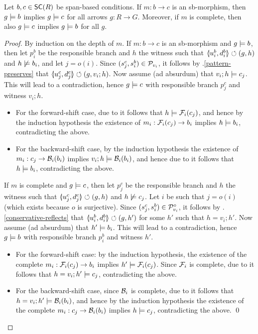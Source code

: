\begin{proposition}
Let $b,c \in \SC{R}$ be span-based conditions. If $m:b\to c$ is an sb-morphism, then $g\models b$ implies $g \models c$ for all arrows $g:R\to G$. Moreover, if $m$ is complete, then also $g\models c$ implies $g\models b$ for all $g$.
\end{proposition}
%
\begin{fullorname}
\begin{proof}
By induction on the depth of $m$. If $m:b\to c$ is an sb-morphism and $g\models b$, then let $p^b_i$ be the responsible branch and $h$ the witness such that $\spanof{u^b_i}{d^b_i}\commutes (g,h)$ and $h\not\models b_i$, and let $j=o(i)$. Since $(s^c_j,s^b_i)\in \mathcal{P}_{v_i}$, it follows by .\ref{pattern-preserves} that $\spanof{u^c_j}{d^c_j}\commutes (g,v_i;h)$. Now assume (ad absurdum) that $v_i;h\models c_j$. This will lead to a contradiction, hence $g\models c$ with responsible branch $p^c_j$ and witness $v_i;h$.
\begin{itemize}[topsep=\smallskipamount]
\item For the forward-shift case, due to  it follows that $h\models \mathcal{F}_i(c_j)$, and hence by the induction hypothesis the existence of $m_i:\mathcal{F}_i(c_j)\rightarrow b_i$ implies $h\models b_i$, contradicting the above.

\item For the backward-shift case, by the induction hypothesis the existence of $m_i:c_j\rightarrow \mathcal{B}_i(b_i)$ implies $v_i;h\models \mathcal{B}_i(b_i)$, and hence due to  it follows that $h\models b_i$, contradicting the above.
\end{itemize}
If $m$ is complete and $g\models c$, then let $p^c_j$ be the responsible branch and $h$ the witness such that $\spanof{u^c_j}{d^c_j}\commutes (g,h)$ and $h\not\models c_j$. Let $i$ be such that $j=o(i)$ (which exists because $o$ is surjective). Since $(s^c_j,s^b_i)\in \mathcal{P}^\circ_{v_i}$, it follows by .\ref{conservative-reflects} that $\spanof{u^b_i}{d^b_i}\commutes (g,h')$ for some $h'$ such that $h=v_i;h'$. Now assume (ad absurdum) that $h'\models b_i$. This will lead to a contradiction, hence $g\models b$ with responsible branch $p^b_i$ and witness $h'$.
\begin{itemize}[topsep=\smallskipamount]
\item For the forward-shift case: by the induction hypothesis, the existence of the complete $m_i:\mathcal{F}_i(c_j)\rightarrow b_i$ implies $h'\models \mathcal{F}_i(c_j)$. Since $\mathcal{F}_i$ is complete, due to  it follows that $h=v_i;h'\models c_j$, contradicting the above.
\item For the backward-shift case, since $\mathcal{B}_i$ is complete, due to  it follows that $h=v_i;h'\models \mathcal{B}_i(b_i)$, and hence by the induction hypothesis the existence of the complete $m_i:c_j\rightarrow \mathcal{B}_i(b_i)$ implies $h\models c_j$, contradicting the above.
\qed
\end{itemize}
\end{proof}
\end{fullorname}
